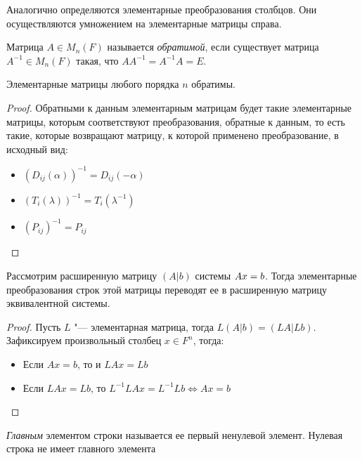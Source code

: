 \begin{note}
	Аналогично определяются элементарные преобразования столбцов. Они осуществляются умножением на элементарные матрицы справа.
\end{note}

\begin{definition}
	Матрица $A \in M_n(F)$ называется \textit{обратимой}, если существует матрица $A^{-1} \in M_n(F)$ такая, что $AA^{-1} = A^{-1}A = E$.
\end{definition}

\begin{proposition}
	Элементарные матрицы любого порядка $n$ обратимы.
\end{proposition}

\begin{proof}
	Обратными к данным элементарным матрицам будет такие элементарные матрицы, которым соответствуют преобразования, обратные к данным, то есть такие, которые возвращают матрицу, к которой применено преобразование, в исходный вид:
	\begin{itemize}
		\item $(D_{ij}(\alpha))^{-1} = D_{ij}(-\alpha)$
		\item $(T_{i}(\lambda))^{-1} = T_{i}(\lambda^{-1})$
		\item $(P_{ij})^{-1} = P_{ij}$\qedhere
	\end{itemize}
\end{proof}

\begin{corollary}
	Рассмотрим расширенную матрицу $(A|b)$ системы $Ax \hm{=} b$. Тогда элементарные преобразования строк этой матрицы переводят ее в расширенную матрицу эквивалентной системы.
\end{corollary}

\begin{proof}
	Пусть $L$ "--- элементарная матрица, тогда $L(A|b) = (LA|Lb)$. Зафиксируем произвольный столбец $x \in F^n$, тогда:
	\begin{itemize}
		\item Если $Ax = b$, то и $LAx = Lb$
		\item Если $LAx = Lb$, то $L^{-1}LAx = L^{-1}Lb \Leftrightarrow Ax = b$\qedhere
	\end{itemize}
\end{proof}

\begin{definition}
	\textit{Главным} элементом строки называется ее первый ненулевой элемент. Нулевая строка не имеет главного элемента
\end{definition}

